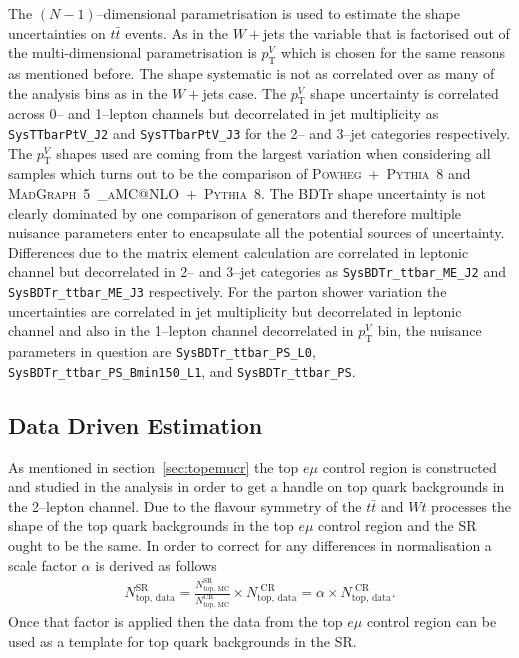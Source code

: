 The $(N-1)$--dimensional parametrisation is used to estimate the shape
uncertainties on $t\bar{t}$ events. As in the $W+$jets the variable that is
factorised out of the multi-dimensional parametrisation is $p_{\mathrm{T}}^V$ which is
chosen for the same reasons as mentioned before. The shape systematic is not as
correlated over as many of the analysis bins as in the $W+$jets case. The
$p_{\mathrm{T}}^V$ shape uncertainty is correlated across 0-- and 1--lepton channels but
decorrelated in jet multiplicity as \texttt{SysTTbarPtV\_J2} and
\texttt{SysTTbarPtV\_J3} for the 2-- and 3--jet categories respectively. The
$p_{\mathrm{T}}^V$ shapes used are coming from the largest variation when considering all
samples which turns out to be the comparison of
\textsc{Powheg}~+~\textsc{Pythia}~8 and
\textsc{MadGraph}~5~\textsc{\_aMC@NLO}~+~\textsc{Pythia}~8. The BDTr shape
uncertainty is not clearly dominated by one comparison of generators and
therefore multiple nuisance parameters enter to encapsulate all the potential
sources of uncertainty. Differences due to the matrix element calculation are
correlated in leptonic channel but decorrelated in 2-- and 3--jet categories as
\texttt{SysBDTr\_ttbar\_ME\_J2} and \texttt{SysBDTr\_ttbar\_ME\_J3}
respectively. For the parton shower variation the uncertainties are correlated
in jet multiplicity but decorrelated in leptonic channel and also in the
1--lepton channel decorrelated in $p_{\mathrm{T}}^V$ bin, the nuisance parameters in
question are \texttt{SysBDTr\_ttbar\_PS\_L0},
\texttt{SysBDTr\_ttbar\_PS\_Bmin150\_L1}, and \texttt{SysBDTr\_ttbar\_PS}.

\subsection{Data Driven Estimation}
\label{sec:ttbar_DD}

As mentioned in section~\ref{sec:topemucr} the top $e\mu$ control region is
constructed and studied in the analysis in order to get a handle on top quark
backgrounds in the 2--lepton channel. Due to the flavour symmetry of the
$t\bar{t}$ and $Wt$ processes the shape of the top quark backgrounds in the top
$e\mu$ control region and the SR ought to be the same. In order to correct for
any differences in normalisation a scale factor $\alpha$ is derived as follows
\begin{align}
  N_{\text{top, data}}^{\text{SR}}
  =
  \frac{N_{\text{top, MC}}^{\text{SR}}}{N_{\text{top, MC}}^{\text{CR}}}
  \times
  N_{\text{top, data}}^{\text{ CR}}
  = \alpha \times N_{\text{top, data}}^{\text{ CR}}.
  \label{eq:TTbar_DD_ExtrapFac}
\end{align}
Once that factor is applied then the data from the top $e\mu$ control region can
be used as a template for top quark backgrounds in the SR.

